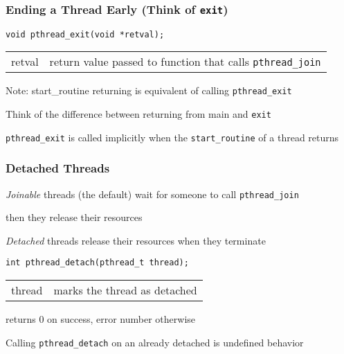   \begin{frame}[fragile]
    \frametitle{Ending a Thread Early (Think of \texttt{exit})}

    \begin{lstlisting}
void pthread_exit(void *retval);
    \end{lstlisting}

    \vspace{1em}

    \begin{tabular}{rl}
      retval & return value passed to function that calls {\tt pthread\_join} \\
    \end{tabular}

    \vspace{2em}
    
    Note: start\_routine returning is equivalent of calling {\tt pthread\_exit}

    \hspace{2em} Think of the difference between returning from main and
    \texttt{exit}

    \vspace{2em}
    {\tt pthread\_exit} is called implicitly when the {\tt start\_routine} of a
    thread returns
  \end{frame}

  \begin{frame}[fragile]
    \frametitle{Detached Threads}

    {\it Joinable} threads (the default) wait for someone to call
    {\tt pthread\_join}
  
    \hspace{2em} then they release their resources

    \vspace{2em}

    {\it Detached} threads release their resources when they terminate

    \vspace{2em}

    \begin{lstlisting}
int pthread_detach(pthread_t thread);
    \end{lstlisting}

    \vspace{1em}

    \begin{tabular}{rl}
      thread & marks the thread as detached \\
    \end{tabular}

    \vspace{2em}

    returns 0 on success, error number otherwise

    \vspace{2em}

    Calling {\tt pthread\_detach} on an already detached is undefined
    behavior
  \end{frame}

